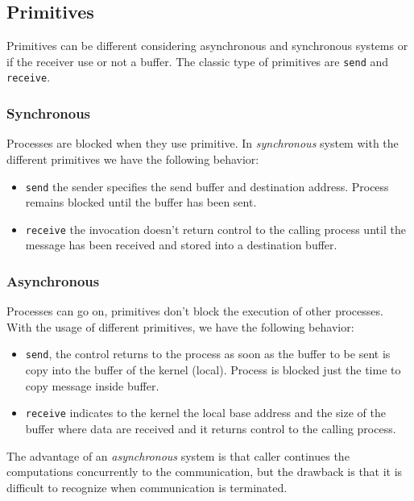 \documentclass[11pt,a4paper]{article}
\begin{document}
\subsection{Primitives}
Primitives can be different considering asynchronous and synchronous systems or if the receiver use or not a buffer. The classic type of primitives are \verb!send! and \verb!receive!.
\subsubsection{Synchronous}
Processes are blocked when they use primitive. In \textit{synchronous} system with the different primitives we have the following behavior:
\begin{itemize}
	\item \verb!send! the sender specifies the send buffer and destination address. Process remains blocked until the buffer has been sent. 
	\item \verb!receive! the invocation doesn't return control to the calling process until the message has been received and stored into a destination buffer.
\end{itemize}
\subsubsection{Asynchronous}
Processes can go on, primitives don't block the execution of other processes. With the usage of different primitives, we have the following behavior:  
\begin{itemize}
	\item \verb!send!, the control returns to the process as soon as the buffer to be sent is copy into the buffer of the kernel (local). Process is blocked just the time to copy message inside buffer. 
	\item \verb!receive! indicates to the kernel the local base address and the size of the buffer where data are received and it returns control to the calling process.
\end{itemize}
The advantage of an \textit{asynchronous} system is that caller continues the computations concurrently to the communication, but the drawback is that it is difficult to recognize when communication is terminated.
\end{document}

